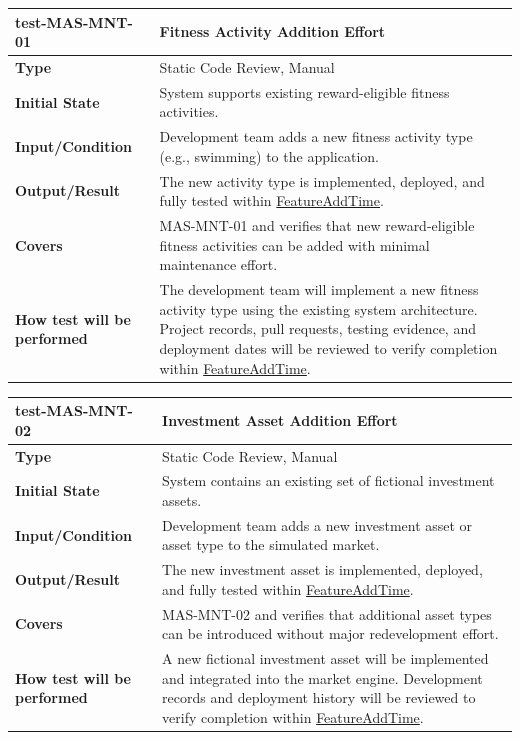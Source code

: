 \documentclass[12pt, titlepage]{article}
\newcommand{\const}[1]{\hyperlink{const:#1}{\textsf{#1}}}
\begin{document}
\noindent\begin{tabularx}{\textwidth}{>{\raggedright\arraybackslash}p{3.5cm}X}
  \toprule
  \textbf{test-MAS-MNT-01} & \textbf{Fitness Activity Addition Effort}\\
  \midrule
  \textbf{Type} & Static Code Review, Manual\\
  \textbf{Initial State} & System supports existing reward-eligible fitness activities.\\
  \textbf{Input/Condition} & Development team adds a new fitness activity type (e.g., swimming) to the application.\\
  \textbf{Output/Result} & The new activity type is implemented, deployed, and fully tested within \const{FeatureAddTime}.\\
  \textbf{Covers} & MAS-MNT-01 and verifies that new reward-eligible fitness activities can be added with minimal maintenance effort.\\
  \textbf{How test will be performed} & The development team will implement a new fitness activity type using the existing system architecture. Project records, pull requests, testing evidence, and deployment dates will be reviewed to verify completion within \const{FeatureAddTime}.\\
  \bottomrule
\end{tabularx}

\vspace{1em}

\noindent\begin{tabularx}{\textwidth}{>{\raggedright\arraybackslash}p{3.5cm}X}
  \toprule
  \textbf{test-MAS-MNT-02} & \textbf{Investment Asset Addition Effort}\\
  \midrule
  \textbf{Type} & Static Code Review, Manual\\
  \textbf{Initial State} & System contains an existing set of fictional investment assets.\\
  \textbf{Input/Condition} & Development team adds a new investment asset or asset type to the simulated market.\\
  \textbf{Output/Result} & The new investment asset is implemented, deployed, and fully tested within \const{FeatureAddTime}.\\
  \textbf{Covers} & MAS-MNT-02 and verifies that additional asset types can be introduced without major redevelopment effort.\\
  \textbf{How test will be performed} & A new fictional investment asset will be implemented and integrated into the market engine. Development records and deployment history will be reviewed to verify completion within \const{FeatureAddTime}.\\
  \bottomrule
\end{tabularx}
\end{document}
